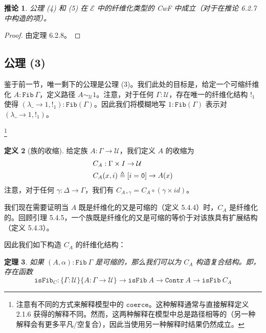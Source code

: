 \documentclass{ctexrep}
\let\mathbb\relax %
\theoremstyle{plain}
\newtheorem{theorem}{定理}[section]
\newtheorem{corollary}[theorem]{推论}
\theoremstyle{definition}
\newtheorem{definition}[theorem]{定义}
\theoremstyle{remark}
\begin{document}
\begin{corollary}
公理 (4) 和 (5) 在 $\mathcal{E}$ 中的纤维化类型的 CwF 中成立（对于在推论 6.2.7 中构造的项）。
\end{corollary}

\begin{proof}
由定理 6.2.8。
\end{proof}

\subsection{公理 (3)}

鉴于前一节，唯一剩下的公理是公理 (3)。我们此处的目标是，给定一个可缩纤维化 $A : \mathtt{Fib}\ \Gamma$，定义路径 $A \sim_{\mathcal{U}} 1$。注意，对于任何 $\Gamma : \mathcal{U}$，存在唯一的纤维化结构 $!_1$ 使得 $(\lambda\_ \to 1, !_1) : \mathtt{Fib}(\Gamma)$。因此我们将模糊地写 $1 : \mathtt{Fib}(\Gamma)$ 表示对 $(\lambda\_ \to 1, !_1)$。

\footnote{注意有不同的方式来解释模型中的 $\mathtt{coerce}$。这种解释通常与直接解释定义 2.1.6 获得的解释不同。然而，这两种解释在模型中总是路径相等的（另一种解释会有更多平凡/空复合），因此当使用另一种解释时结果仍然成立。}

\begin{definition}[族的收缩]
给定族 $A : \Gamma \to \mathcal{U}$，我们定义 $A$ 的收缩为
\begin{align*}
& C_A : \Gamma \times \mathbb{I} \to \mathcal{U} \\
& C_A(x,i) \triangleq [i = \mathtt{0}] \to A(x)
\end{align*}
注意，对于任何 $\gamma : \Delta \to \Gamma$，我们有 $C_{A \circ \gamma} = C_A \circ (\gamma \times  id )$。
\end{definition}

我们现在需要证明当 $A$ 既是纤维化的又是可缩的（定义 5.4.4）时，$C_A$ 是纤维化的。回顾引理 5.4.5，一个族既是纤维化的又是可缩的等价于对该族具有扩展结构（定义 5.4.3）。

因此我们如下构造 $C_A$ 的纤维化结构：

\begin{theorem}
如果 $(A,\alpha) : \mathtt{Fib}\ \Gamma$ 是可缩的，那么我们可以为 $C_A$ 构造复合结构。即，存在函数
$$\mathtt{isFib}_C : \{\Gamma : \mathcal{U}\}\{A : \Gamma \to \mathcal{U}\} \to \mathtt{isFib}\ A \to \mathtt{Contr}\ A \to \mathtt{isFib}\ C_A$$
\end{theorem}
\end{document}
